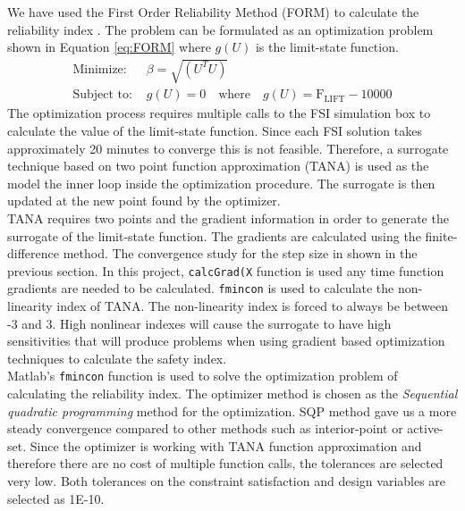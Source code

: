 \documentclass[paper=a4, fontsize=12pt]{scrartcl} %
\begin{document}
We have used the First Order Reliability Method (FORM) to calculate the reliability index \cite{choi2007reliability}. The problem can be formulated as an optimization problem shown in Equation \eqref{eq:FORM} where $g(U)$ is the limit-state function.
%
\begin{subequations}\label{eq:FORM}
\begin{align}
	\text{Minimize: }& \beta = \sqrt{\left( U^T U \right)}
	\\
	\text{Subject to: }& g \left( U \right) = 0 \quad \text{where} \quad
		g(U) = \text{F}_{\text{LIFT}} - 10000
\end{align}
\end{subequations}
%
The optimization process requires multiple calls to the FSI simulation box to calculate the value of the limit-state function. Since each FSI solution takes approximately 20 minutes to converge this is not feasible. Therefore, a surrogate technique based on two point function approximation (TANA) \cite{wang1995improved} is used as the model the inner loop inside the optimization procedure. The surrogate is then updated at the new point found by the optimizer.\\

TANA requires two points and the gradient information in order to generate the surrogate of the limit-state function. The gradients are calculated using the finite-difference method. The convergence study for the step size in shown in the previous section. In this project, \texttt{calcGrad(X} function is used any time function gradients are needed to be calculated. \texttt{fmincon} is used to calculate the non-linearity index of TANA. The non-linearity index is forced to always be between -3 and 3. High nonlinear indexes will cause the surrogate to have high sensitivities that will produce problems when using gradient based optimization techniques to calculate the safety index.\\

Matlab's \texttt{fmincon} function is used to solve the optimization problem of calculating the reliability index. The optimizer method is chosen as the \emph{Sequential quadratic programming} method for the optimization. SQP method gave us a more steady convergence compared to other methods such as interior-point or active-set. Since the optimizer is working with TANA function approximation and therefore there are no cost of multiple function calls, the tolerances are selected very low. Both tolerances on the constraint satisfaction and design variables are selected as 1E-10.\\
\end{document}
